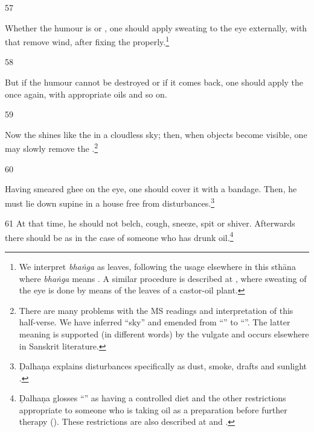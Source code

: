 \begin{translation}
    
    
    \item[57]
    
    
    
    Whether the humour is  or , one should apply
    sweating to the eye externally, with  that remove wind, after
    fixing the  properly.\footnote{We interpret \emph{bhaṅga} as
    leaves, following the usage elsewhere in this sthāna 
    where \emph{bhaṅga} means . A similar procedure is
    described at , where sweating of the eye is done by means 
    of the
    leaves of a castor-oil plant.}
    
    
    \item[58]
    
    But if the humour cannot be destroyed or if it comes back, one should apply the
     once again, with appropriate oils and so on.
    
    
    \item[59]
    
    
    Now the  shines like the  in a cloudless sky; then, 
    when objects become visible, one may slowly remove the 
    .\footnote{There are many problems with the MS readings and 
    interpretation of this half-verse.  We have inferred “sky” and emended from 
    “” to “”.  The 
    latter 
    meaning is supported (in different words) by the vulgate and occurs elsewhere in Sanskrit 
    literature.}
    
    \item[60]
    
    Having smeared ghee on the eye, one should cover it with a bandage.  Then, he must lie 
    down supine in a house free from disturbances.\footnote{Ḍalhaṇa explains disturbances 
    specifically as dust, smoke, drafts and sunlight .} 
    
    \item[61]
    At that time, he should not belch, cough, sneeze, spit or shiver.  Afterwards there should be 
     as in the case of someone who has drunk 
    oil.\footnote{Ḍalhaṇa glosses “” as having a controlled diet 
    and 
    the other restrictions appropriate to someone who is taking oil as a preparation before 
    further 
    therapy (). These restrictions are also described at  
    and   .}
    

\end{translation}
